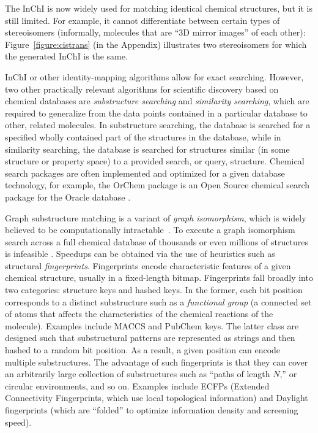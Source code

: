 \documentclass{sig-alternate}
\begin{document}
The InChI is now widely used for matching identical chemical
structures, but it is still limited. For example, it cannot
differentiate between certain types of stereoisomers (informally,
molecules that are ``3D mirror images'' of each other):
Figure~\ref{figure:cistrans} (in the Appendix) illustrates two
stereoisomers for which the generated InChI is the same.

InChI or other identity-mapping algorithms allow for exact
searching. However, two other practically relevant algorithms for
scientific discovery based on chemical databases are
\emph{substructure searching} and \emph{similarity searching}, which
are required to generalize from the data points contained in a
particular database to other, related molecules. In substructure
searching, the database is searched for a specified wholly contained
part of the structures in the database, while in similarity searching,
the database is searched for structures similar (in some structure or
property space) to a provided search, or query, structure. Chemical
search packages are often implemented and optimized for a given
database technology, for example, the OrChem package is an Open Source
chemical search package for the Oracle database \cite{rijnbeek2009}.

Graph substructure matching is a variant of \emph{graph isomorphism},
which is widely believed to be computationally
intractable~\cite{cordella2001}. To execute a graph isomorphism search
across a full chemical database of thousands or even millions of
structures is infeasible \cite{Weininger:2011ly}. Speedups can be
obtained via the use of heuristics such as structural
\emph{fingerprints}. Fingerprints encode characteristic features of a
given chemical structure, usually in a fixed-length
bitmap. Fingerprints fall broadly into two categories: structure keys
and hashed keys. In the former, each bit position corresponds to a
distinct substructure such as a \emph{functional group} (a connected
set of atoms that affects the characteristics of the chemical
reactions of the molecule). Examples include MACCS and PubChem
keys. The latter class are designed such that substructural patterns
are represented as strings and then hashed to a random bit
position. As a result, a given position can encode multiple
substructures. The advantage of such fingerprints is that they can
cover an arbitrarily large collection of substructures such as ``paths
of length $N$,'' or circular environments, and so on. Examples include
ECFPs (Extended Connectivity Fingerprints, which use local topological
information) and Daylight fingerprints (which are ``folded'' to
optimize information density and screening speed).
\end{document}
